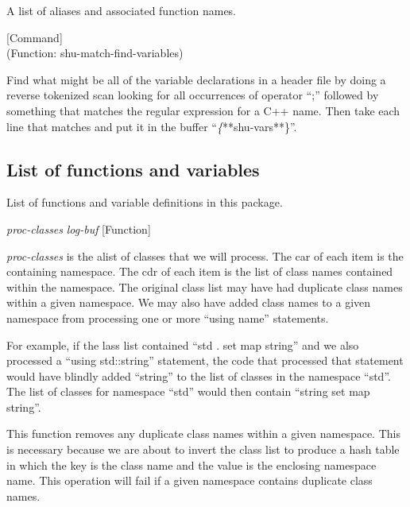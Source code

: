 A list of aliases and associated function names.



\vspace{1em}
\noindent
{}
\usebox{\funcname}
 \hfill [Command]\\%
 (Function: shu-match-find-variables)

\begin{doc-string}
Find what might be all of the variable declarations in a header file by doing
a reverse tokenized scan looking for all occurrences of operator ``;'' followed
by something that matches the regular expression for a C++ name.  Then take each
line that matches and put it in the buffer ``\emph\{**shu-vars**\}''.
\end{doc-string}

\subsection{List of functions and variables}

List of functions and variable definitions in this package.



\vspace{1em}
\noindent
{}
\usebox{\funcname}\emph{proc-classes} \emph{log-buf}
 \hfill [Function]

\begin{doc-string}
\emph{proc-classes} is the alist of classes that we will process.  The car of each
item is the containing namespace.  The cdr of each item is the list of class
names contained within the namespace.  The original class list may have had
duplicate class names within a given namespace.  We may also have added class
names to a given namespace from processing one or more ``using name''
statements.

For example, if the lass list contained ``std . set map string'' and we also
processed a ``using std::string'' statement, the code that processed that
statement would have blindly added ``string'' to the list of classes in the
namespace ``std''.  The list of classes for namespace ``std'' would then contain
``string set map string''.

This function removes any duplicate class names within a given namespace.  This
is necessary because we are about to invert the class list to produce a hash
table in which the key is the class name and the value is the enclosing
namespace name.  This operation will fail if a given namespace contains
duplicate class names.
\end{doc-string}

